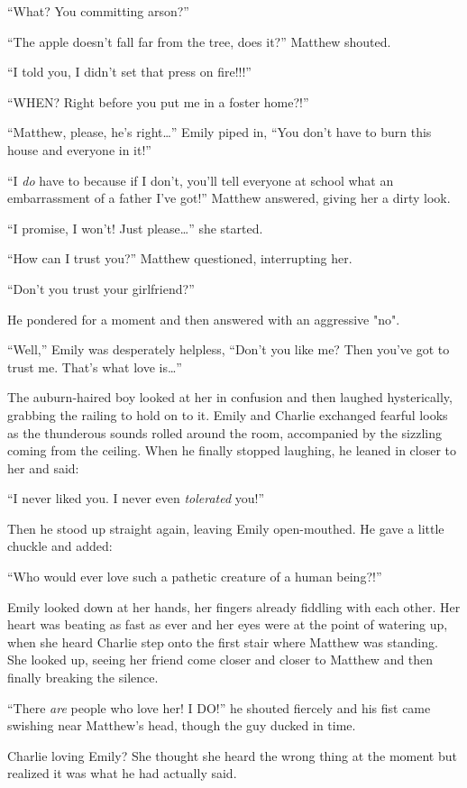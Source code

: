 “What? You committing arson?”

“The apple doesn't fall far from the tree, does it?” Matthew shouted.

“I told you, I didn't set that press on fire!!!”

“WHEN? Right before you put me in a foster home?!”

“Matthew, please, he's right…” Emily piped in, “You don't have to burn this house and everyone in it!”

“I \textit{do} have to because if I don't, you'll tell everyone at school what an embarrassment of a father I've got!” Matthew answered, giving her a dirty look.

“I promise, I won't! Just please…” she started.

“How can I trust you?” Matthew questioned, interrupting her.

“Don't you trust your girlfriend?”

He pondered for a moment and then answered with an aggressive "no".

“Well,” Emily was desperately helpless, “Don't you like me? Then you've got to trust me. That's what love is…”

The auburn-haired boy looked at her in confusion and then laughed hysterically, grabbing the railing to hold on to it. Emily and Charlie exchanged fearful looks as the thunderous sounds rolled around the room, accompanied by the sizzling coming from the ceiling. When he finally stopped laughing, he leaned in closer to her and said:

“I never liked you. I never even \textit{tolerated} you!”

Then he stood up straight again, leaving Emily open-mouthed. He gave a little chuckle and added:

“Who would ever love such a pathetic creature of a human being?!”

Emily looked down at her hands, her fingers already fiddling with each other. Her heart was beating as fast as ever and her eyes were at the point of watering up, when she heard Charlie step onto the first stair where Matthew was standing. She looked up, seeing her friend come closer and closer to Matthew and then finally breaking the silence.

“There \textit{are} people who love her! I DO!” he shouted fiercely and his fist came swishing near Matthew's head, though the guy ducked in time.

Charlie loving Emily? She thought she heard the wrong thing at the moment but realized it was what he had actually said.

